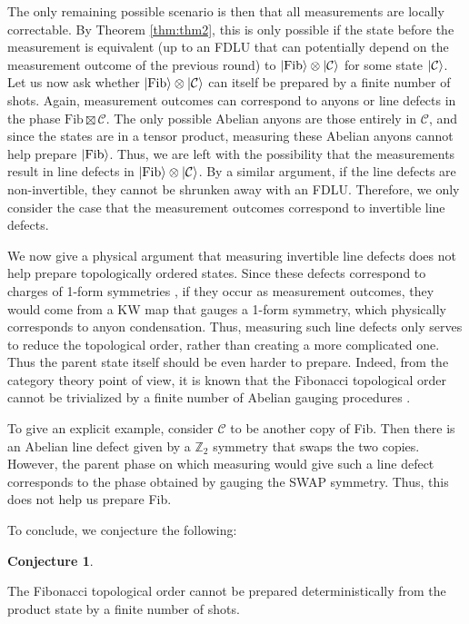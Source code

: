 \documentclass[nofootinbib,prx,twocolumn,showpacs,superscriptaddress,notitlepage,amsmath,amssymb]{revtex4-2}
\theoremstyle{definition}
\def\ket#1{\mathinner{|{#1}\rangle}}
\def\ZZ{\mathbb Z}
\newtheorem{conjecture}[theorem]{Conjecture}
\begin{document}
The only remaining possible scenario is then that all measurements are locally correctable. By Theorem \ref{thm:thm2}, this is only possible if the state before the measurement is equivalent (up to an FDLU that can potentially depend on the measurement outcome of the previous round) to $\ket{\textrm{Fib}} \otimes \ket{\mathcal C}$ for some state $\ket{\mathcal C}$.
Let us now ask whether $\ket{\textrm{Fib}} \otimes \ket{\mathcal C}$ can itself be prepared by a finite number of shots. Again, measurement outcomes can correspond to anyons or line defects in the phase $\textrm{Fib} \boxtimes \mathcal C$. The only possible Abelian anyons are those entirely in $\mathcal C$, and since the states are in a tensor product, measuring these Abelian anyons cannot help prepare $\ket{\textrm{Fib}}$. Thus, we are left with the possibility that the measurements result in line defects in $\ket{\textrm{Fib}} \otimes \ket{\mathcal C}$. By a similar argument, if the line defects are non-invertible, they cannot be shrunken away with an FDLU. Therefore, we only consider the case that the measurement outcomes correspond to invertible line defects.

We now give a physical argument that measuring invertible line defects does not help prepare topologically ordered states. Since these defects correspond to charges of 1-form symmetries \cite{generalizedglobalsymmetries}, if they occur as measurement outcomes, they would come from a KW map that gauges a 1-form symmetry, which physically corresponds to anyon condensation. Thus, measuring such line defects only serves to reduce the topological order, rather than creating a more complicated one. Thus the parent state itself should be even harder to prepare. Indeed, from the category theory point of view, it is known that the Fibonacci topological order cannot be trivialized by a finite number of Abelian gauging procedures \cite{Etingof2011weakly}.

To give an explicit example, consider $\mathcal C$ to be another copy of Fib. Then there is an Abelian line defect given by a $\ZZ_2$ symmetry that swaps the two copies. However, the parent phase on which measuring would give such a line defect corresponds to the phase obtained by gauging the SWAP symmetry. Thus, this does not help us prepare Fib.

To conclude, we conjecture the following:
\begin{conjecture}
\label{thm:fib}
\begin{shaded}
The Fibonacci topological order cannot be prepared deterministically from the product state by a finite number of shots.
\end{shaded}
\end{conjecture}
\end{document}
